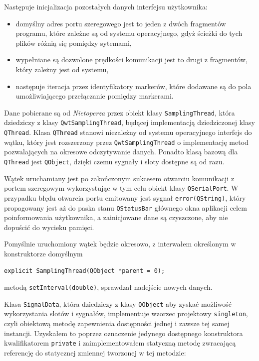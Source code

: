 Następuje inicjalizacja pozostałych danych interfejsu użytkownika:
\begin{itemize}
  \item domyślny adres portu szeregowego \ppauza jest to jeden z dwóch fragmentów programu, które zależne są od systemu operacyjnego, gdyż ścieżki do tych plików różnią się pomiędzy sytemami,
  \item wypełniane są dozwolone prędkości komunikacji \ppauza jest to drugi z fragmentów, który zależny jest od systemu,
  \item następuje iteracja przez identyfikatory markerów, które dodawane są do pola umożliwiającego przełączanie pomiędzy markerami.
\end{itemize}

Dane pobierane są od \textsl{Nietoperza} przez obiekt klasy \verb|SamplingThread|, która dziedziczy z klasy \verb|QwtSamplingThread|, będącej implementacją dziedziczonej klasy \verb|QThread|. Klasa \verb|QThread| stanowi niezależny od systemu operacyjnego interfejs do wątku, który jest rozszerzony przez \verb|QwtSamplingThread| o implementację metod pozwalających na okresowe odczytywanie danych. Ponadto klasą bazową dla \verb|QThread| jest \verb|QObject|, dzięki czemu sygnały i sloty dostępne są od razu.

Wątek uruchamiany jest po zakończonym sukcesem otwarciu komunikacji z portem szeregowym wykorzystując w tym celu obiekt klasy \verb|QSerialPort|. W przypadku błędu otwarcia portu emitowany jest sygnał \verb|error(QString)|, który propagowany jest aż do paska stanu \verb|QStatusBar| głównego okna aplikacji celem poinformowania użytkownika, a zainicjowane dane są czyszczone, aby nie dopuścić do wycieku pamięci.

Pomyślnie uruchomiony wątek będzie okresowo, z interwałem określonym w konstruktorze domyślnym
\begin{verbatim}
explicit SamplingThread(QObject *parent = 0);
\end{verbatim}
metodą \verb|setInterval(double)|, sprawdzał nadejście nowych danych.

Klasa \verb|SignalData|, która dziedziczy z klasy \verb|QObject| aby zyskać możliwość wykorzystania slotów i sygnałów, implementuje wzorzec projektowy \verb|singleton|, czyli obiektową metodę zapewnienia dostępności jednej i zawsze tej samej instancji. Uzyskałem to poprzez oznaczenie jedynego dostępnego konstruktora kwalifikatorem \verb|private| i zaimplementowałem statyczną metodę zwracającą referencję do statycznej zmiennej tworzonej w tej metodzie:
\begin{verbatimtab}
class SignalData : public QObject
{
	Q_OBJECT
	SignalData();
public:
	static SignalData &instance();
\end{verbatimtab}

